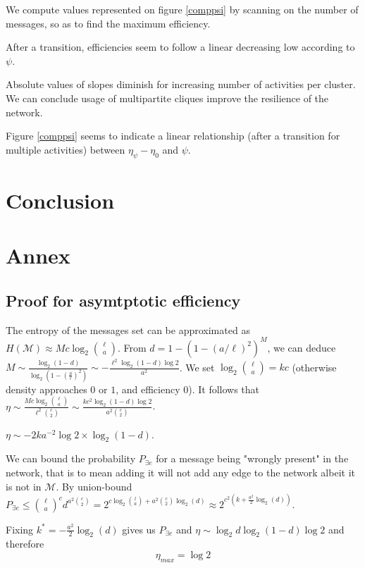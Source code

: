 \documentclass[english,10pt,twocolumn]{IEEEtran}
\renewcommand{\le}{\leqslant}
\theoremstyle{definition}
\begin{document}
	We compute values represented on figure \ref{comppsi} by scanning on the number of messages, so as to find the maximum efficiency.	
	
	After a transition, efficiencies seem to follow a linear decreasing low according to $\psi$.
	
	Absolute values of slopes diminish for increasing number of activities per cluster. We can conclude usage of multipartite cliques improve the resilience of the network.
	
	
	
	
	Figure \ref{comppsi} seems to indicate a linear relationship (after a transition for multiple activities) between $\eta_\psi -\eta_0$ and $\psi$.
	
	
	\section{Conclusion}	
	
	
	
	\section*{Annex}
	
	\subsection*{Proof for asymtptotic efficiency}
	
	The entropy of the messages set can be approximated as $H(\mathcal{M}) \approx M c \log_2 {\ell \choose a}$. From $d = 1 - \left (1- \left(a/\ell\right)^2 \right)^M$, we can deduce $M \sim \frac{\log_2(1-d)}{\log_2(1-(\frac{a}{\ell})^2)} \sim - \frac{\ell^2 \log_2(1-d) \log 2}{a^2}$.
		We set $\log_2 {\ell \choose a} = k c$ (otherwise density approaches $0$ or $1$, and efficiency $0$). It follows that $\eta \sim \frac{M c \log_2 {\ell \choose a}}{\ell^2 {c \choose 2}} \sim \frac{k c^2 \log_2(1-d)\log 2}{a^2 {c \choose 2}}$. 
		
		$\eta \sim - 2 k  a^{-2}\log 2 \times \log_2 (1-d)$.
		
		We can bound the probability $P_{\exists e}$ for a message being "wrongly present" in the network, that is to mean adding it will not add any edge to the network albeit it is not in $\mathcal{M}$. By union-bound $P_{\exists e} \le {\ell \choose a}^c d^{a^2 {c \choose 2}} = 2^{c \log_ 2 {l \choose a} + a^2 {c \choose 2 }\log_2(d)} \approx 2^{c^2(k + \frac{a^2}{2} \log_2 (d))}$.
		
		Fixing $k^* = -\frac{a^2}{2} \log_2 (d)$ gives us $P_{\exists e}$ and $\eta \sim \log_2 d \log_2 (1-d) \log 2$ and therefore \[\eta_{max} = \log 2\]	
	
\end{document}
